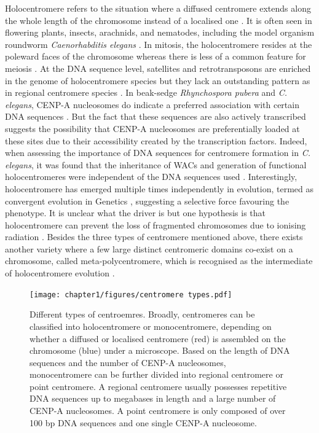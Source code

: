 Holocentromere refers to the situation where a diffused centromere extends along the whole length of the chromosome instead of a localised one \citep{Guerra2010NeocentricsRules}. It is often seen in flowering plants, insects, arachnids, and nematodes, including the model organism roundworm \textit{Caenorhabditis elegans} \citep{Wong2020LessonsChromosomes}. In mitosis, the holocentromere resides at the poleward faces of the chromosome whereas there is less of a common feature for meiosis \citep{Maddox2004HoloerElegans, Buchwitz1999AElegans, Marques2016HolocentromereHolocentromeres}. At the DNA sequence level, satellites and retrotransposons are enriched in the genome of holocentromere species but they lack an outstanding pattern as in regional centromere species \citep{Kang2016DifferentialElimination, Heckmann2013TheOrganization, Marques2016RestructuringPubera}. In beak-sedge \textit{Rhynchospora pubera} and \textit{C. elegans}, CENP-A nucleosomes do indicate a preferred association with certain DNA sequences \citep{Marques2016HolocentromereHolocentromeres, Gassmann2012AnElegans, Steiner2014HolocentromeresHotspots}. But the fact that these sequences are also actively transcribed suggests the possibility that CENP-A nucleosomes are preferentially loaded at these sites due to their accessibility created by the transcription factors. Indeed, when assessing the importance of DNA sequences for centromere formation in \textit{C. elegans}, it was found that the inheritance of WACs and generation of functional holocentromeres were independent of the DNA sequences used \citep{Stinchcomb1985ExtrachromosomalElegans, Yuen2011RapidEmbryos}. Interestingly, holocentromere has emerged multiple times independently in evolution, termed as convergent evolution in Genetics \citep{Guerra2019MonocentricFamily, Drinnenberg2014RecurrentInsects, Melters2012HolocentricAnalysis}, suggesting a selective force favouring the phenotype. It is unclear what the driver is but one hypothesis is that holocentromere can prevent the loss of fragmented chromosomes due to ionising radiation \citep{Zedek2018HolocentricLand}. Besides the three types of centromere mentioned above, there exists another variety where a few large distinct centromeric domains co-exist on a chromosome, called meta-polycentromere, which is recognised as the intermediate of holocentromere evolution \citep{Neumann2012StretchingDomains}. 

\begin{figure}[htbp]
  \centering
  \texttt{[image: chapter1/figures/centromere types.pdf]}
  \caption[Different types of centroemres]{Different types of centroemres. Broadly, centromeres can be classified into holocentromere or monocentromere, depending on whether a diffused or localised centromere (red) is assembled on the chromosome (blue) under a microscope. Based on the length of DNA sequences and the number of CENP-A nucleosomes, monocentromere can be further divided into regional centromere or point centromere. A regional centromere usually possesses repetitive DNA sequences up to megabases in length and a large number of CENP-A nucleosomes. A point centromere is only composed of over 100 bp DNA sequences and one single CENP-A nucleosome. }
  \label{fig:cenTypes}
\end{figure}


